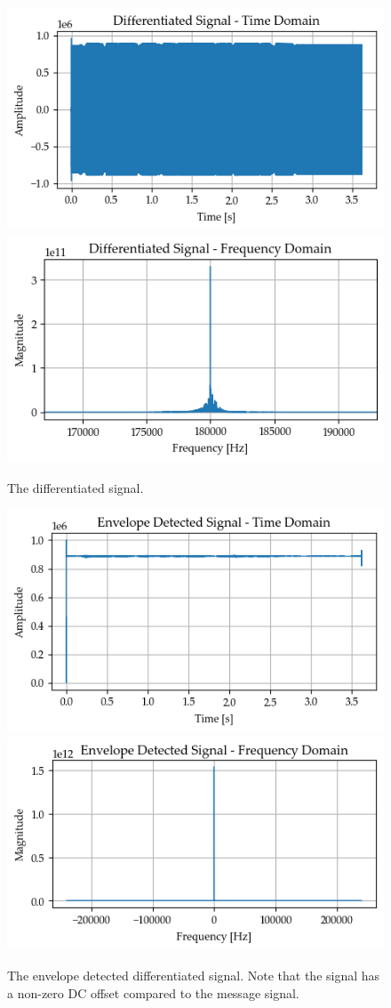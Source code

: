 \documentclass[../ECE459FinalProjectReport.tex]{subfiles}
\begin{document}
\begin{figure}[tb]
    \centering
    \includegraphics[width=0.49\linewidth]{plots/fm/diff_signal_time.png}
    \includegraphics[width=0.49\linewidth]{plots/fm/diff_signal_freq_bw.png}
    \caption{The differentiated signal.}
    \label{fig:fm-diff}
\end{figure}
\begin{figure}[tb]
    \centering
    \includegraphics[width=0.49\linewidth]{plots/fm/envelope_signal_time.png}
    \includegraphics[width=0.49\linewidth]{plots/fm/envelope_signal_freq.png}
    \caption{The envelope detected differentiated signal. Note that the signal has a non-zero DC offset compared to the message signal.}
    \label{fig:fm-envelope}
\end{figure}
\end{document}
